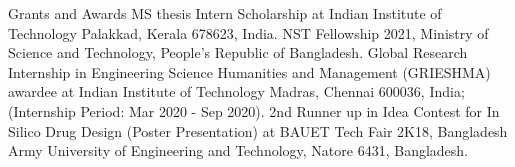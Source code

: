 
\begin{rubric}{Grants and Awards}
    \noentry{}
    \entry*[2022]
        MS thesis Intern Scholarship at Indian Institute of Technology Palakkad, Kerala 678623, India.
    \entry*[2021]
        NST Fellowship 2021, Ministry of Science and Technology, People's Republic of Bangladesh.
    \entry*[2020]
        Global Research Internship in Engineering Science Humanities and Management (GRIESHMA) awardee at Indian Institute of Technology Madras, Chennai 600036, India; (Internship Period: Mar 2020 - Sep 2020).
    \entry*[2018]
        2nd Runner up in Idea Contest for In Silico Drug Design (Poster Presentation) at BAUET Tech Fair 2K18, Bangladesh Army University of Engineering and Technology, Natore 6431, Bangladesh.
\end{rubric}
    